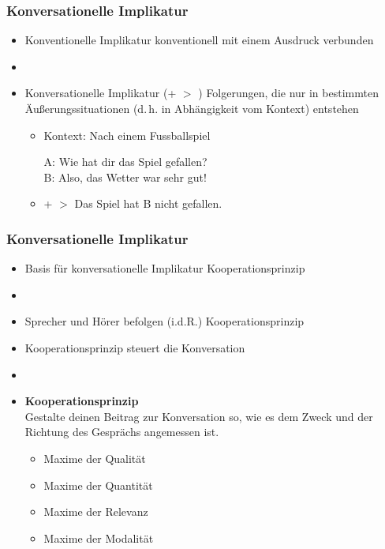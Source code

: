 
\begin{frame}
\frametitle{Konversationelle Implikatur}

\begin{itemize}
	\item Konventionelle Implikatur \ras konventionell mit einem Ausdruck verbunden
	\item[]
	\item Konversationelle Implikatur (+ $>$ ) \ras
Folgerungen, die nur in bestimmten Äu\ss{}erungssituationen (d.\,h. in Abhängigkeit vom Kontext) entstehen

\vspace{5mm}

	\begin{itemize}
		\item Kontext: Nach einem Fussballspiel
		
		\ea A: Wie hat dir das Spiel gefallen?\\
B: Also, das Wetter war sehr gut!
		\z

		\item[] + $>$ Das Spiel hat B nicht gefallen.
	\end{itemize}
	
\end{itemize}

\end{frame}



\begin{frame}
\frametitle{Konversationelle Implikatur}

\begin{itemize}
	\item Basis für konversationelle Implikatur \ras Kooperationsprinzip
	\item[]
	\item Sprecher und Hörer befolgen (i.d.R.) Kooperationsprinzip
	\item Kooperationsprinzip steuert die Konversation
	\item[]
	\item \textbf{Kooperationsprinzip}\\
Gestalte deinen Beitrag zur Konversation so, wie es dem Zweck und der Richtung des Gesprächs angemessen ist.

	\begin{itemize}
	\item Maxime der Qualität
	\item Maxime der Quantität
	\item Maxime der Relevanz
	\item Maxime der Modalität
	\end{itemize}
	
\end{itemize}

\end{frame}


